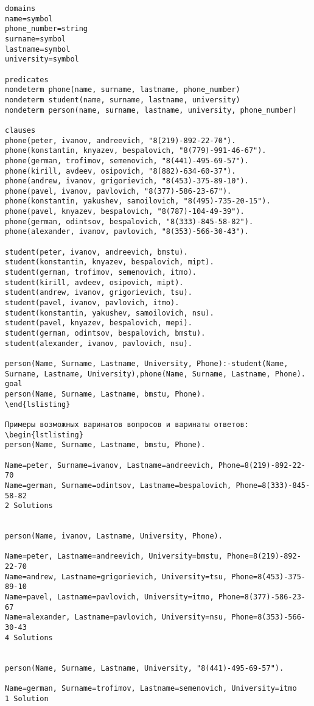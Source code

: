 \begin{lstlisting}
domains
name=symbol
phone_number=string
surname=symbol
lastname=symbol
university=symbol

predicates
nondeterm phone(name, surname, lastname, phone_number)
nondeterm student(name, surname, lastname, university)
nondeterm person(name, surname, lastname, university, phone_number)

clauses
phone(peter, ivanov, andreevich, "8(219)-892-22-70").
phone(konstantin, knyazev, bespalovich, "8(779)-991-46-67"). 
phone(german, trofimov, semenovich, "8(441)-495-69-57").     
phone(kirill, avdeev, osipovich, "8(882)-634-60-37").        
phone(andrew, ivanov, grigorievich, "8(453)-375-89-10").     
phone(pavel, ivanov, pavlovich, "8(377)-586-23-67").
phone(konstantin, yakushev, samoilovich, "8(495)-735-20-15").
phone(pavel, knyazev, bespalovich, "8(787)-104-49-39").      
phone(german, odintsov, bespalovich, "8(333)-845-58-82").    
phone(alexander, ivanov, pavlovich, "8(353)-566-30-43").
   
student(peter, ivanov, andreevich, bmstu).
student(konstantin, knyazev, bespalovich, mipt).
student(german, trofimov, semenovich, itmo).
student(kirill, avdeev, osipovich, mipt).
student(andrew, ivanov, grigorievich, tsu).
student(pavel, ivanov, pavlovich, itmo).
student(konstantin, yakushev, samoilovich, nsu).
student(pavel, knyazev, bespalovich, mepi).
student(german, odintsov, bespalovich, bmstu).
student(alexander, ivanov, pavlovich, nsu).

person(Name, Surname, Lastname, University, Phone):-student(Name, Surname, Lastname, University),phone(Name, Surname, Lastname, Phone).
goal	
person(Name, Surname, Lastname, bmstu, Phone).
\end{lslisting}

Примеры возможных варинатов вопросов и варинаты ответов:
\begin{lstlisting}
person(Name, Surname, Lastname, bmstu, Phone).

Name=peter, Surname=ivanov, Lastname=andreevich, Phone=8(219)-892-22-70
Name=german, Surname=odintsov, Lastname=bespalovich, Phone=8(333)-845-58-82
2 Solutions


person(Name, ivanov, Lastname, University, Phone).

Name=peter, Lastname=andreevich, University=bmstu, Phone=8(219)-892-22-70
Name=andrew, Lastname=grigorievich, University=tsu, Phone=8(453)-375-89-10
Name=pavel, Lastname=pavlovich, University=itmo, Phone=8(377)-586-23-67
Name=alexander, Lastname=pavlovich, University=nsu, Phone=8(353)-566-30-43
4 Solutions


person(Name, Surname, Lastname, University, "8(441)-495-69-57").

Name=german, Surname=trofimov, Lastname=semenovich, University=itmo
1 Solution
\end{lstlisting}